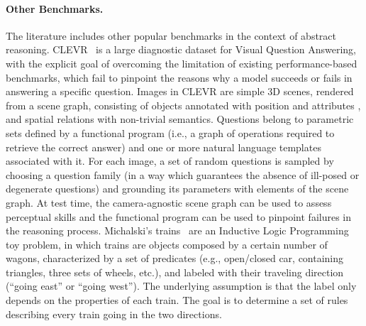 \paragraph{Other Benchmarks.}
The literature includes other popular benchmarks in the context of abstract reasoning. %
CLEVR~\cite{johnson2017clevr} is a large diagnostic dataset for Visual Question Answering, with the explicit goal of overcoming the limitation of existing performance-based benchmarks, which fail to pinpoint the reasons why a model succeeds or fails in answering a specific question.
Images in CLEVR are simple 3D scenes, rendered from a scene graph, consisting of objects annotated with position %
and attributes%
, and spatial relations with non-trivial semantics. %
Questions belong to parametric sets defined by a functional program (i.e., a graph of operations required to retrieve the correct answer) and one or more natural language templates associated with it.
For each image, a set of random questions is sampled by choosing a question family (in a way which guarantees the absence of ill-posed or degenerate questions) and grounding its parameters with elements of the scene graph.
At test time, the camera-agnostic scene graph can be used to assess perceptual skills and the functional program can be used to pinpoint failures in the reasoning process.
Michalski's trains~\cite{larson1977inductive} are an Inductive Logic Programming toy problem, in which trains are objects composed by a certain number of wagons, characterized by a set of predicates (e.g., open/closed car, containing triangles, three sets of wheels, etc.), and labeled with their traveling direction (``going east'' or ``going west''). The underlying assumption is that the label only depends on the properties of each train. The goal is to determine a set of rules describing every train going in the two directions. %
